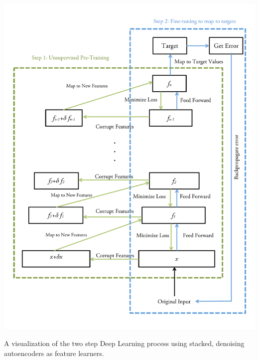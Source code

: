 \begin{FPfigure} 
\begin{center} 
\includegraphics[width=1.2\textwidth]{figures/deeplearning.pdf}
\caption[Short figure name.]{A visualization of the two step Deep Learning process using stacked, denoising autoencoders as feature learners. \label{fig:deeplearning}}
\end{center}
\end{FPfigure}
\afterpage{\clearpage}






















